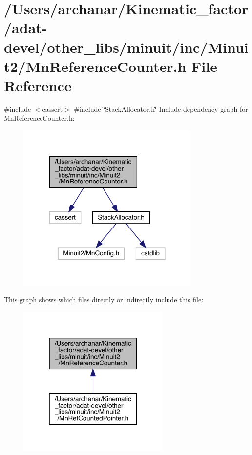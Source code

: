 \hypertarget{adat-devel_2other__libs_2minuit_2inc_2Minuit2_2MnReferenceCounter_8h}{}\section{/\+Users/archanar/\+Kinematic\+\_\+factor/adat-\/devel/other\+\_\+libs/minuit/inc/\+Minuit2/\+Mn\+Reference\+Counter.h File Reference}
\label{adat-devel_2other__libs_2minuit_2inc_2Minuit2_2MnReferenceCounter_8h}
{\ttfamily \#include $<$cassert$>$}\newline
{\ttfamily \#include \char`\"{}Stack\+Allocator.\+h\char`\"{}}\newline
Include dependency graph for Mn\+Reference\+Counter.\+h\+:
\nopagebreak
\begin{figure}[H]
\begin{center}
\leavevmode
\includegraphics[width=257pt]{d9/d30/adat-devel_2other__libs_2minuit_2inc_2Minuit2_2MnReferenceCounter_8h__incl}
\end{center}
\end{figure}
This graph shows which files directly or indirectly include this file\+:
\nopagebreak
\begin{figure}[H]
\begin{center}
\leavevmode
\includegraphics[width=214pt]{db/d54/adat-devel_2other__libs_2minuit_2inc_2Minuit2_2MnReferenceCounter_8h__dep__incl}
\end{center}
\end{figure}
